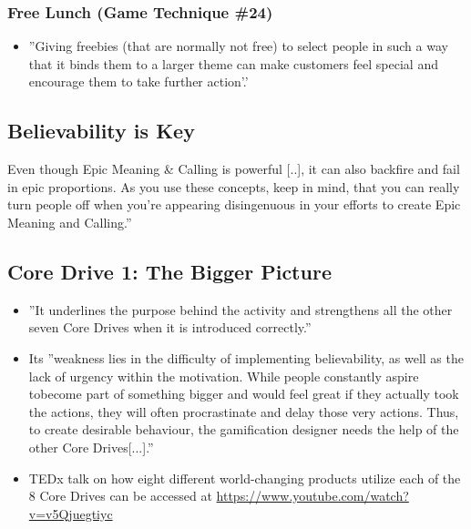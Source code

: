     \subsubsection{Free Lunch (Game Technique \#24)}
    \begin{itemize}
        \item ''Giving freebies (that are normally not free) to select people in such a way that it binds them to a larger theme can make customers feel special and encourage them to take further action'.'
    \end{itemize}
    
    \subsection{Believability is Key}
    Even though Epic Meaning \& Calling is powerful [..], it can also backfire and fail in epic proportions. As you use these concepts, keep in mind, that you can really turn people off when you're appearing disingenuous in your efforts to create Epic Meaning and Calling.''
    
    \subsection{Core Drive 1: The Bigger Picture}
    \begin{itemize}
        \item ''It underlines the purpose behind the activity and strengthens all the other seven Core Drives when it is introduced correctly.''
        \item Its ''weakness lies in the difficulty of implementing believability, as well as the lack of urgency within the motivation. While people constantly aspire tobecome part of something bigger and would feel great if they actually took the actions, they will often procrastinate and delay those very actions. Thus, to create desirable behaviour, the gamification designer needs the help of the other Core Drives[...].''
        \item TEDx talk on how eight different world-changing products utilize each of the 8 Core Drives can be accessed at \url{https://www.youtube.com/watch?v=v5Qjuegtiyc}
    \end{itemize}
